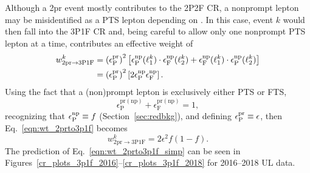 Although a 2pr event mostly contributes to the 2P2F CR, a nonprompt lepton may be misidentified as a PTS lepton depending on \effnppass.
In this case, event $k$ would then fall into the 3P1F CR and, being careful to allow only one nonprompt PTS lepton at a time, contributes an effective weight of
\begin{align}
	\label{eqn:wt_2prto3p1f}
	w^{k}_{\mathrm{2pr \to 3P1F}}
	&= \left( \epsilon^{\mathrm{pr}}_\mathrm{P} \right)^2 
	\left[
		\epsilon^{\mathrm{np}}_\mathrm{P}(\ell_1^k) \cdot \epsilon^{\mathrm{np}}_\mathrm{F}(\ell_2^k) + \epsilon^{\mathrm{np}}_\mathrm{F}(\ell_1^k) \cdot \epsilon^{\mathrm{np}}_\mathrm{P}(\ell_2^k)
	\right]
	\notag
	\\
	&= \left( \epsilon^{\mathrm{pr}}_\mathrm{P} \right)^2
	\left[
		2 \epsilon^{\mathrm{np}}_\mathrm{P} \epsilon^{\mathrm{np}}_\mathrm{F}
	\right].
\end{align}
Using the fact that a (non)prompt lepton is exclusively either PTS or FTS,
\begin{equation*}
	\epsilon^\mathrm{pr(np)}_\mathrm{P} + \epsilon^\mathrm{pr(np)}_\mathrm{F} = 1,
\end{equation*}
recognizing that $\epsilon^{\mathrm{np}}_\mathrm{P} \equiv f$ (Section~\ref{sec:redbkg}), and defining $\epsilon^{\mathrm{pr}}_\mathrm{P} \equiv \epsilon$,
then Eq.~\ref{eqn:wt_2prto3p1f}  %
becomes
\begin{equation}
	\label{eqn:wt_2prto3p1f_simp}
	w^{k}_{\mathrm{2pr \to 3P1F}} = 2 \epsilon^2 f (1-f).
\end{equation}
The prediction of Eq.~\ref{eqn:wt_2prto3p1f_simp} can be seen in Figures~\ref{cr_plots_3p1f_2016}--\ref{cr_plots_3p1f_2018} for 2016--2018 UL data.

